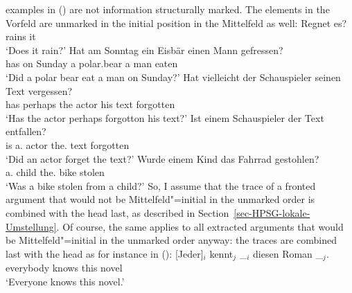 examples in () are not information structurally marked. The elements in the Vorfeld are
unmarked in the initial position in the Mittelfeld as well:
\eal
\ex
\gll Regnet es?\\
     rains it\\
\glt `Does it rain?'
\ex 
\gll Hat am Sonntag ein Eisbär einen Mann gefressen?\\
     has on Sunday  a   polar.bear a man eaten\\
\glt `Did a polar bear eat a man on Sunday?'
\ex 
\gll Hat vielleicht der Schauspieler seinen Text vergessen?\\
     has perhaps    the actor his text forgotten\\
\glt `Has the actor perhaps forgotton his text?'
\ex 
\gll Ist einem Schauspieler der Text entfallen?\\
     is  a.\dat{} actor     the.\nom{} text forgotten\\
\glt `Did an actor forget the text?'
\ex
\gll Wurde einem Kind das Fahrrad gestohlen?\\
     \AUX{} a.\dat{} child the.\nom{} bike stolen\\
\glt `Was a bike stolen from a child?'
\zl
So, I assume that the trace of a fronted argument that would not be Mittelfeld"=initial in the unmarked order is combined with
the head last, as described in Section~\ref{sec-HPSG-lokale-Umstellung}. Of course, the same applies
to all extracted arguments that would be Mittelfeld"=initial in the unmarked order anyway: the
traces are combined last with the head as for instance in ():
\ea
\label{Beispiel-jeder-kennt-diesen-Roman-HPSG}
\gll {}[Jeder]$_i$ kennt$_j$ \_$_i$ diesen Roman \_$_j$.\\
	 {}\spacebr{}everybody knows {} this novel\\
\glt `Everyone knows this novel.'
\z

